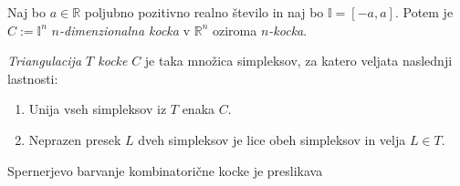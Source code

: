\documentclass[mat1]{fmfdelo}
\newcommand{\R}{\mathbb R}
\newcommand{\I}{\mathbb I}
\newcommand{\0}{\underline{0}}
\begin{document}
\begin{definicija}
Naj bo $a \in \R$ poljubno pozitivno realno število in naj bo $\I = \left [ -a, a \right ] $. Potem je $C := \I^n$ \emph{$n$-dimenzionalna kocka} v $\R^n$ oziroma \emph{$n$-kocka}.
\end{definicija}

\begin{definicija}
\emph{Triangulacija $T$ kocke} $C$ je taka množica simpleksov, za katero veljata naslednji lastnosti:
\begin{enumerate}
\item Unija vseh simpleksov iz $T$ enaka $C$.
\item Neprazen presek $L$ dveh simpleksov je lice obeh simpleksov in velja $L \in T$.
\end{enumerate}
\end{definicija}

\begin{definicija}
Spernerjevo barvanje kombinatorične kocke je preslikava 
\end{definicija}
\end{document}
